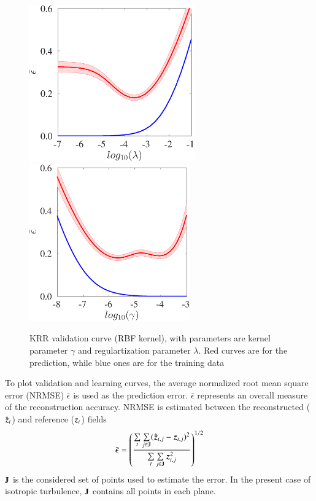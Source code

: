 \begin{figure}
	\centering
	\includegraphics[height=6.75cm]{./images/regression/KRR_validationcurve_lambda.eps}
	\hspace{0.3cm}
	\includegraphics[height=6.75cm]{./images/regression/KRR_validationcurve_gamma.eps}	
	\caption{\label{fig:KRR_validationcurve} KRR validation curve (RBF kernel), with parameters are kernel parameter $ \gamma $ and regulartization parameter $ \lambda $. Red curves are for the prediction, while blue ones are for the training data}
\end{figure}

To plot validation and learning curves, the average normalized root mean square error (NRMSE) $ \bar{\epsilon} $ is used as the prediction error. $ \bar{\epsilon} $ represents an overall measure of the reconstruction accuracy. NRMSE is estimated between the reconstructed ($ \hat{\operatorname{\boldsymbol{z}}}_t $) and reference ($ \operatorname{\boldsymbol{z}}_t $) fields
\begin{equation}
\bar{\epsilon} = \left(\frac{ \sum\limits_{t} \sum\limits_{j\in \varmathbb{J}}(\hat{\mybold{z}}_{t,j}-\mybold{z}_{t,j})^2}{\sum\limits_{t} \sum\limits_{j\in \varmathbb{J}}\mybold{z}_{t,j}^2}\right)^{1/2}
\label{eq:NRMSE}
\end{equation} 
$ \varmathbb{J} $ is the considered set of points used to estimate the error. In the present case of isotropic turbulence, $ \varmathbb{J} $ contains all points in each plane.

